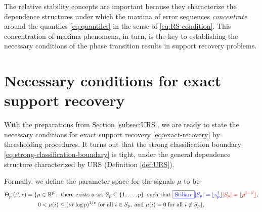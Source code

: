 The relative stability concepts are important because they characterize the dependence structures under which the maxima of error sequences {\em concentrate} around the quantiles \eqref{eq:quantiles} in the sense of \eqref{eq:RS-condition}.
This concentration of maxima phenomena, in turn, is the key to establishing the necessary conditions of the phase transition results in support recovery problems.


\section{Necessary conditions for exact support recovery}
\label{subsec:necessary}

With the preparations from Section \ref{subsec:URS}, we are ready to state the necessary conditions for exact support recovery \eqref{eq:exact-recovery} by thresholding procedures. 
It turns out that the strong classification boundary \eqref{eq:strong-classification-boundary} is tight, under the general dependence structure characterized by URS (Definition \ref{def:URS}).

Formally, we define the parameter space for the signals $\mu$ to be
\begin{align} \label{eq:minimax-signal-config-under}
    \Theta_p^-(\beta, \overline{r}) &= \{\mu\in\mathbb{R}^p:\;\text{there exists a set }S_p\subseteq\{1,\ldots,p\}\;\text{ such that }
    {\color{blue}\fbox{Stilian:} |S_p| = \lfloor s_p^\dagger \rfloor }{\color{red} |S_p|=\lfloor p^{1-\beta}\rfloor}, \nonumber \\
    &\quad\quad0<\mu(i)\le(\nu\overline{r}\log{p})^{1/\nu}\;\text{for all }i\in S_p,\;\text{and }\mu(i)=0\;\text{for all }i\not\in S_p\},
\end{align}


